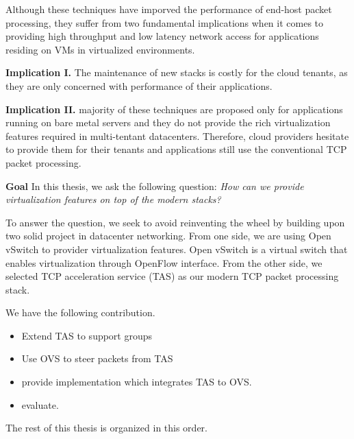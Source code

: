 Although these techniques have imporved the performance of end-host packet processing, they 
suffer from two fundamental implications when it comes to providing high throughput and 
low latency network access for applications residing on VMs in virtualized environments. 

\textbf{Implication I.} The maintenance of new stacks is costly for the cloud tenants, 
as they are only concerned with performance of their applications.

\textbf{Implication II.} majority of these techniques are proposed only for applications running on bare metal 
servers and they do not provide the rich virtualization features required in 
multi-tentant datacenters. Therefore, cloud providers hesitate to provide them for their
tenants and applications still use the conventional TCP packet processing.

\textbf{Goal} In this thesis, we ask the following question: \emph{How can we provide virtualization 
features on top of the modern stacks?} 

To answer the question, we seek to avoid reinventing the wheel by building upon two solid project
in datacenter networking. From one side, we are using Open vSwitch to provider virtualization 
features. Open vSwitch is a virtual switch that enables virtualization through OpenFlow interface.
From the other side, we selected TCP acceleration service (TAS) as our modern TCP packet processing
stack.  


We have the following contribution.
\begin{itemize}
    \item Extend TAS to support groups
    \item Use OVS to steer packets from TAS
    \item provide implementation which integrates TAS to OVS.
    \item evaluate.
\end{itemize}

The rest of this thesis is organized in this order.




